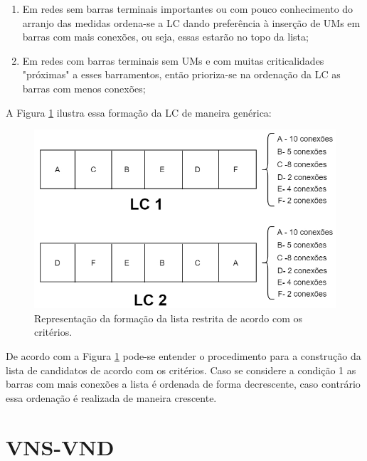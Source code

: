 \documentclass[12pt]{article}
\begin{document}
\begin{enumerate}
	\item Em redes sem barras terminais importantes ou com pouco conhecimento do arranjo das medidas ordena-se a LC dando preferência à inserção de UMs em barras com mais conexões, ou seja, essas estarão no topo da lista;
	
	\item Em redes com barras terminais sem UMs e com muitas criticalidades "próximas" a esses barramentos, então prioriza-se na ordenação da LC as barras com menos conexões;
	
\end{enumerate} 


A Figura \ref{fig9} ilustra essa formação da LC de maneira genérica:

\begin{figure}[H]
	\centering 
	\includegraphics[scale=0.6]{figuras/LC_construct.jpg}
	\caption{Representação da formação da lista restrita de acordo com os critérios.}
	\label{fig9} %
\end{figure}

De acordo com a Figura \ref{fig9} pode-se entender o procedimento para a construção da lista de candidatos de acordo com os critérios. Caso se considere a condição 1 as barras com mais conexões a lista é ordenada de forma decrescente, caso contrário essa ordenação é realizada de maneira crescente.

\section{VNS-VND}
\end{document}
